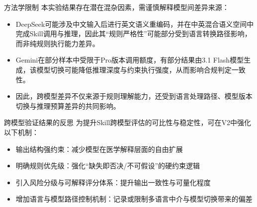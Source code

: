 \begin{frame}[fragile]{方法学限制}
\small
本实验结果存在潜在混杂因素，需谨慎解释模型间差异来源：
\begin{itemize}
  \item DeepSeek可能涉及中文输入后进行英文语义重编码，并在中英混合语义空间中完成Skill调用与推理，因此其“规则严格性”可能部分受到语言转换路径影响，而非纯规则执行能力差异。
  \item Gemini在部分样本中受限于Pro版本调用额度，有部分结果由3.1 Flash模型生成，该模型切换可能降低推理深度与约束执行强度，从而影响合规判定一致性。
  \item 因此，跨模型差异不仅来源于规则理解能力，还受到语言处理路径、模型版本切换与推理预算差异的共同影响。
\end{itemize}

\end{frame}

\begin{frame}[fragile]{跨模型验证结果的反思}
为提升Skill跨模型评估的可比性与稳定性，可在V2中强化以下机制：
\begin{itemize}
  \item 输出结构强约束：减少模型在医学解释层面的自由扩展
  \item 明确规则优先级：强化“缺失即否决/不可假设”的硬约束逻辑
  \item 引入风险分级与可解释评分体系：提升输出一致性与可量化程度
  \item 增加语言与模型路径控制机制：记录或限制多语言中介与模型切换带来的偏差
\end{itemize}

\end{frame}
